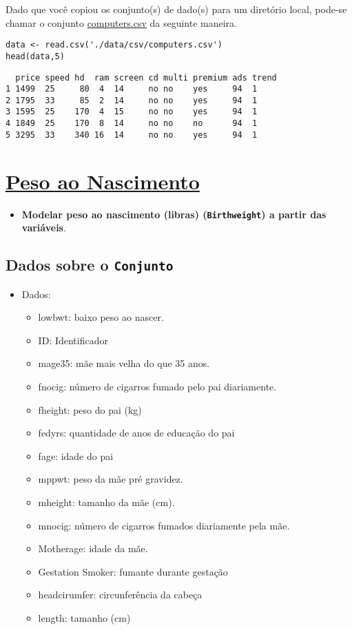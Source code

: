 \documentclass[12pt]{abntex2}
\begin{document}
Dado que você copiou os conjunto(s) de dado(s) para um diretório
local, pode-se chamar o conjunto \href{https://drive.google.com/file/d/1C1-9aM-dYzx7UQrWq\_gg4DRw6wtj-l7Z/view?usp=sharing}{computers.csv} da seguinte maneira.

\begin{verbatim}
data <- read.csv('./data/csv/computers.csv')
head(data,5)
\end{verbatim}

\begin{verbatim}
  price speed hd  ram screen cd multi premium ads trend
1 1499  25     80  4  14     no no    yes     94  1    
2 1795  33     85  2  14     no no    yes     94  1    
3 1595  25    170  4  15     no no    yes     94  1    
4 1849  25    170  8  14     no no    no      94  1    
5 3295  33    340 16  14     no no    yes     94  1    
\end{verbatim}


\section{\href{https://www.sheffield.ac.uk/mash/statistics/datasets}{Peso ao Nascimento}}
\label{sec:org2845403}
\begin{itemize}
\item \textbf{Modelar peso ao nascimento (libras) (\texttt{Birthweight}) a partir das variáveis}.
\end{itemize}
\subsection{Dados sobre o \texttt{Conjunto}}
\label{sec:orga4d228d}
\begin{itemize}
\item Dados:
\begin{itemize}
\item lowbwt: baixo peso ao nascer.
\item ID: Identificador
\item mage35: mãe mais velha do que 35 anos.
\item fnocig: número de cigarros fumado pelo pai diariamente.
\item fheight: peso do pai (kg)
\item fedyrs: quantidade de anos de educação do pai
\item fage: idade do pai
\item mppwt: peso da mãe pré gravidez.
\item mheight: tamanho da mãe (cm).
\item mnocig: número de cigarros fumados diariamente pela mãe.
\item Motherage: idade da mãe.
\item Gestation Smoker: fumante durante gestação
\item headcirumfer: circunferência da cabeça
\item length: tamanho (cm)
\end{itemize}
\end{itemize}
\end{document}
